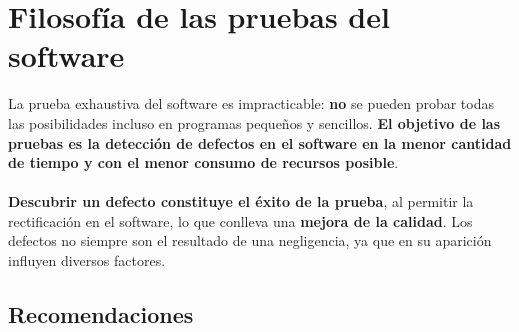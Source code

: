 \section{Filosofía de las pruebas del software}
La prueba exhaustiva del software es impracticable: \textbf{no} se pueden probar todas las posibilidades incluso en programas pequeños y sencillos. \textbf{El objetivo de las pruebas es la detección de defectos en el software en la menor cantidad de tiempo y con el menor consumo de recursos posible}.\\\\
\textbf{Descubrir un defecto constituye el éxito de la prueba}, al permitir la rectificación en el software, lo que conlleva una \textbf{mejora de la calidad}. Los defectos no siempre son el resultado de una negligencia, ya que en su aparición influyen diversos factores.

\subsection{Recomendaciones}

